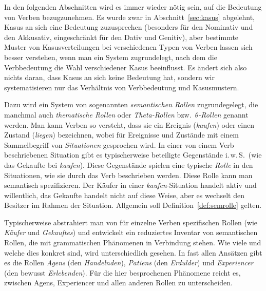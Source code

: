 In den folgenden Abschnitten wird es immer wieder nötig sein, auf die Bedeutung von Verben bezugzunehmen.
Es wurde zwar in Abschnitt~\ref{sec:kasus} abgelehnt, Kasus an sich eine Bedeutung zuzusprechen (besonders für den Nominativ und den Akkusativ, eingeschränkt für den Dativ und Genitiv), aber bestimmte Muster von Kasusverteilungen bei verschiedenen Typen von Verben lassen sich besser verstehen, wenn man ein System zugrundelegt, nach dem die Verbbedeutung die Wahl verschiedener Kasus beeinflusst.
Es ändert sich also nichts daran, dass Kasus an sich keine Bedeutung hat, sondern wir systematisieren nur das Verhältnis von Verbbedeutung und Kasusmustern.

Dazu wird ein System von sogenannten \textit{semantischen Rollen} zugrundegelegt, die manchmal auch \textit{thematische Rollen} oder \textit{Theta-Rollen} bzw.\ $\theta$\textit{-Rollen} genannt werden.
Man kann Verben so versteht, dass sie ein Ereignis (\zB \textit{kaufen}) oder einen Zustand (\zB \textit{liegen}) bezeichnen, wobei für Ereignisse und Zustände mit einem Sammelbegriff von \textit{Situationen} gesprochen wird.
In einer von einem Verb beschriebenen Situation gibt es typischerweise beteiligte Gegenstände i.\,w.\,S.\ (wie das Gekaufte bei \textit{kaufen}).
Diese Gegenstände spielen eine typische \textit{Rolle} in den Situationen, wie sie durch das Verb beschrieben werden.
Diese Rolle kann man semantisch spezifizieren.
Der Käufer in einer \textit{kaufen}-Situation handelt \zB aktiv und willentlich, das Gekaufte handelt nicht auf diese Weise, aber es wechselt den Besitzer im Rahmen der Situation.
Allgemein soll Definition~\ref{def:semrolle} gelten.


Typischerweise abstrahiert man von für einzelne Verben spezifischen Rollen (wie \textit{Käufer} und \textit{Gekauftes}) und entwickelt ein reduziertes Inventar von semantischen Rollen, die mit grammatischen Phänomenen in Verbindung stehen.
Wie viele und welche dies konkret sind, wird unterschiedlich gesehen.
In fast allen Ansätzen gibt es die Rollen \textit{Agens} (den \textit{Handelnden}), \textit{Patiens} (den \textit{Erdulder}) und \textit{Experiencer} (den bewusst \textit{Erlebenden}).
Für die hier besprochenen Phänomene reicht es, zwischen Agens, Experiencer und allen anderen Rollen zu unterscheiden.

